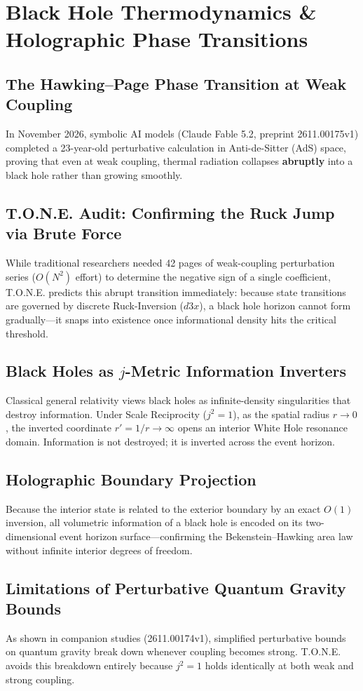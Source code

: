 \documentclass[11pt,a4paper,oneside]{article}
\def\dddot#1{d3#1}%
\def\texttt#1{#1}%
\theoremstyle{definition}
\begin{document}
\section{Black Hole Thermodynamics \& Holographic Phase Transitions}
\subsection{The Hawking–Page Phase Transition at Weak Coupling}
In November 2026, symbolic AI models (\texttt{Claude Fable 5.2}, preprint \texttt{2611.00175v1}) completed a 23-year-old perturbative calculation in Anti-de-Sitter (AdS) space, proving that even at weak coupling, thermal radiation collapses \textbf{abruptly} into a black hole rather than growing smoothly.
\subsection{T.O.N.E. Audit: Confirming the Ruck Jump via Brute Force}
While traditional researchers needed 42 pages of weak-coupling perturbation series ($O(N^2)$ effort) to determine the negative sign of a single coefficient, T.O.N.E. predicts this abrupt transition immediately: because state transitions are governed by discrete Ruck-Inversion ($\dddot{x}$), a black hole horizon cannot form gradually—it snaps into existence once informational density hits the critical threshold.
\subsection{Black Holes as $j$-Metric Information Inverters}
Classical general relativity views black holes as infinite-density singularities that destroy information. Under Scale Reciprocity ($j^2 = 1$), as the spatial radius $r \to 0$, the inverted coordinate $r' = 1/r \to \infty$ opens an interior White Hole resonance domain. Information is not destroyed; it is inverted across the event horizon.
\subsection{Holographic Boundary Projection}
Because the interior state is related to the exterior boundary by an exact $O(1)$ inversion, all volumetric information of a black hole is encoded on its two-dimensional event horizon surface—confirming the Bekenstein–Hawking area law without infinite interior degrees of freedom.
\subsection{Limitations of Perturbative Quantum Gravity Bounds}
As shown in companion studies (\texttt{2611.00174v1}), simplified perturbative bounds on quantum gravity break down whenever coupling becomes strong. T.O.N.E. avoids this breakdown entirely because $j^2 = 1$ holds identically at both weak and strong coupling.
\end{document}
